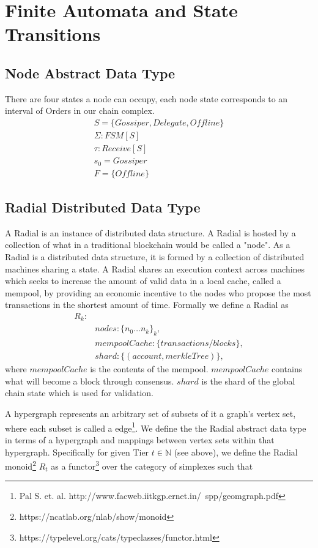 \documentclass{article}
\begin{document}
\section{Finite Automata and State Transitions}
\subsection{Node Abstract Data Type}
There are four states a node can occupy, each node state corresponds to an interval of Orders in our chain complex.
\begin{align*}
S = \{Gossiper, Delegate, Offline\} \\
\Sigma: FSM[S] \\
\tau: Receive[S] \\
s_0 = Gossiper \\
F = \{Offline\}
\end{align*}

\subsection{Radial Distributed Data Type}
A Radial is an instance of distributed data structure. A Radial is hosted by a collection of what in a traditional blockchain would be called a "node".  As a Radial is a distributed data structure, it is formed by a collection of distributed machines sharing a state. A Radial shares an execution context across machines which seeks to increase the amount of valid data in a local cache, called a mempool, by providing an economic incentive to the nodes who propose the most transactions in the shortest amount of time. Formally we define a Radial as 
\begin{align*}
R_k: \\ &
nodes: \{n_0 \dots n_k\}_k, \\ &
mempoolCache: \{transactions/blocks\}, \\ &
shard: \{(account, merkleTree)\}, 
\end{align*}
where $mempoolCache$ is the contents of the mempool. $mempoolCache$ contains what will become a block through consensus. $shard$ is the shard of the global chain state which is used for validation. 

A hypergraph represents an arbitrary set of subsets of it a graph's vertex set, where each subset is called a edge\footnote{Pal S. et. al. http://www.facweb.iitkgp.ernet.in/~spp/geomgraph.pdf}. We define the the Radial abstract data type in terms of a hypergraph and mappings between vertex sets within that hypergraph. Specifically for given Tier $t \in \mathbb{N}$ (see above), we define the Radial monoid\footnote{https://ncatlab.org/nlab/show/monoid} $R_t$ as a functor\footnote{https://typelevel.org/cats/typeclasses/functor.html} over the category of simplexes such that
\end{document}
